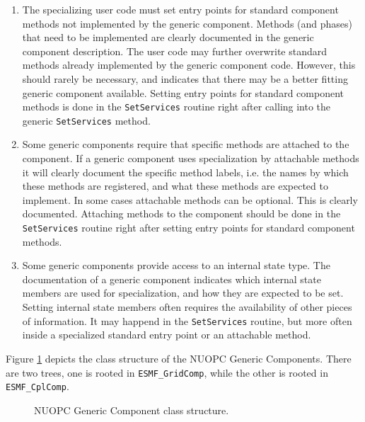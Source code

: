 \begin{enumerate}

\item The specializing user code must set entry points for standard component methods not implemented by the generic component. Methods (and phases) that need to be implemented are clearly documented in the generic component description. The user code may further overwrite standard methods already implemented by the generic component code. However, this should rarely be necessary, and indicates that there may be a better fitting generic component available. Setting entry points for standard component methods is done in the {\tt SetServices} routine right after calling into the generic {\tt SetServices} method.

\item Some generic components require that specific methods are attached to the component. If a generic component uses specialization by attachable methods it will clearly document the specific method labels, i.e. the names by which these methods are registered, and what these methods are expected to implement. In some cases attachable methods can be optional. This is clearly documented. Attaching methods to the component should be done in the {\tt SetServices} routine right after setting entry points for standard component methods.

\item Some generic components provide access to an internal state type. The documentation of a generic component indicates which internal state members are used for specialization, and how they are expected to be set. Setting internal state members often requires the availability of other pieces of information. It may happend in the {\tt SetServices} routine, but more often inside a specialized standard entry point or an attachable method.

\end{enumerate}

Figure \ref{fig:NUOPCGenericComp} depicts the class structure of the NUOPC Generic Components. There are two trees, one is rooted in {\tt ESMF\_GridComp}, while the other is rooted in {\tt ESMF\_CplComp}.
\begin{figure}
\begin{center}
\end{center}
\caption{NUOPC Generic Component class structure.}
\label{fig:NUOPCGenericComp}
\end{figure}


